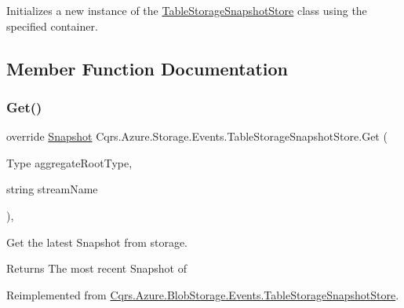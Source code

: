 Initializes a new instance of the \hyperlink{classCqrs_1_1Azure_1_1Storage_1_1Events_1_1TableStorageSnapshotStore}{Table\+Storage\+Snapshot\+Store} class using the specified container. 



\subsection{Member Function Documentation}
\mbox{\label{classCqrs_1_1Azure_1_1Storage_1_1Events_1_1TableStorageSnapshotStore_ac552ed9e69ca9ce8bbd9f14b4ecb546f_ac552ed9e69ca9ce8bbd9f14b4ecb546f}} 
\subsubsection{\texorpdfstring{Get()}{Get()}}
{\footnotesize\ttfamily override \hyperlink{classCqrs_1_1Snapshots_1_1Snapshot}{Snapshot} Cqrs.\+Azure.\+Storage.\+Events.\+Table\+Storage\+Snapshot\+Store.\+Get (\begin{DoxyParamCaption}\item[{Type}]{aggregate\+Root\+Type,  }\item[{string}]{stream\+Name }\end{DoxyParamCaption})\hspace{0.3cm}{\ttfamily [protected]}, {\ttfamily [virtual]}}



Get the latest Snapshot from storage. 

\begin{DoxyReturn}{Returns}
The most recent Snapshot of
\end{DoxyReturn}


Reimplemented from \hyperlink{classCqrs_1_1Azure_1_1BlobStorage_1_1Events_1_1TableStorageSnapshotStore_a169361a7fbf413fed660609f66d95e13_a169361a7fbf413fed660609f66d95e13}{Cqrs.\+Azure.\+Blob\+Storage.\+Events.\+Table\+Storage\+Snapshot\+Store}.


